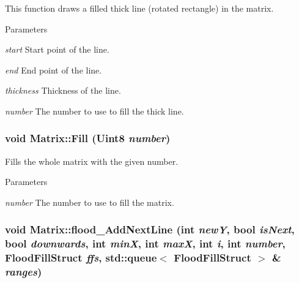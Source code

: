 This function draws a filled thick line (rotated rectangle) in the matrix. 


\begin{DoxyParams}{Parameters}
\item[{\em start}]Start point of the line. \item[{\em end}]End point of the line. \item[{\em thickness}]Thickness of the line. \item[{\em number}]The number to use to fill the thick line. \end{DoxyParams}
\hypertarget{classMatrix_a4a7c3875be94e94786db920c441973e6}{
\subsubsection[{Fill}]{\setlength{\rightskip}{0pt plus 5cm}void Matrix::Fill (Uint8 {\em number})}}
\label{classMatrix_a4a7c3875be94e94786db920c441973e6}


Fills the whole matrix with the given number. 


\begin{DoxyParams}{Parameters}
\item[{\em number}]The number to use to fill the matrix. \end{DoxyParams}
\hypertarget{classMatrix_aaa3962d9bf27f654bd6771a8d5bfaeac}{
\subsubsection[{flood\_\-AddNextLine}]{\setlength{\rightskip}{0pt plus 5cm}void Matrix::flood\_\-AddNextLine (int {\em newY}, \/  bool {\em isNext}, \/  bool {\em downwards}, \/  int {\em minX}, \/  int {\em maxX}, \/  int {\em i}, \/  int {\em number}, \/  {\bf FloodFillStruct} {\em ffs}, \/  std::queue$<$ {\bf FloodFillStruct} $>$ \& {\em ranges})}}
\label{classMatrix_aaa3962d9bf27f654bd6771a8d5bfaeac}


